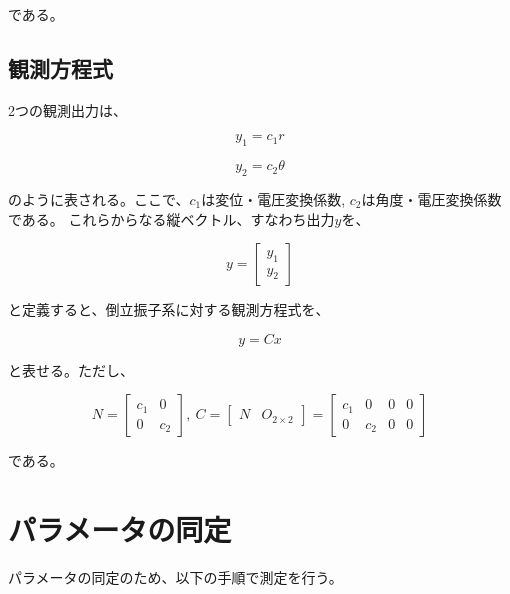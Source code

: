 \documentclass[a4j,11pt,twoside]{jbook}
\begin{document}
である。

\subsection{観測方程式}
2つの観測出力は、

$$
    y_{1} = c_{1} r
$$

$$
    y_{2} = c_{2} \theta
$$

のように表される。ここで、$c_{1}$は変位・電圧変換係数, $c_{2}$は角度・電圧変換係数である。
これらからなる縦ベクトル、すなわち出力$y$を、

$$
    y = 
    \left[
        \begin{array}{c}
            y_{1} \\
            y_{2}
        \end{array}    
    \right]
$$

と定義すると、倒立振子系に対する観測方程式を、

\begin{equation}
    y = Cx
\end{equation}

と表せる。ただし、

$$
    N = 
    \left[
        \begin{array}{cc}
            c_{1}  &  0 \\
            0      &  c_{2}
        \end{array}
    \right],\
    C = 
    \left[
        \begin{array}{cc}
            N  &  O_{2 \times 2}
        \end{array}
    \right]
    =
    \left[
        \begin{array}{cccc}
            c_{1}  &    0    &    0    &    0 \\
            0      &  c_{2}  &    0    &    0
        \end{array}
    \right]
$$

である。

\section{パラメータの同定}
パラメータの同定のため、以下の手順で測定を行う。
\end{document}
